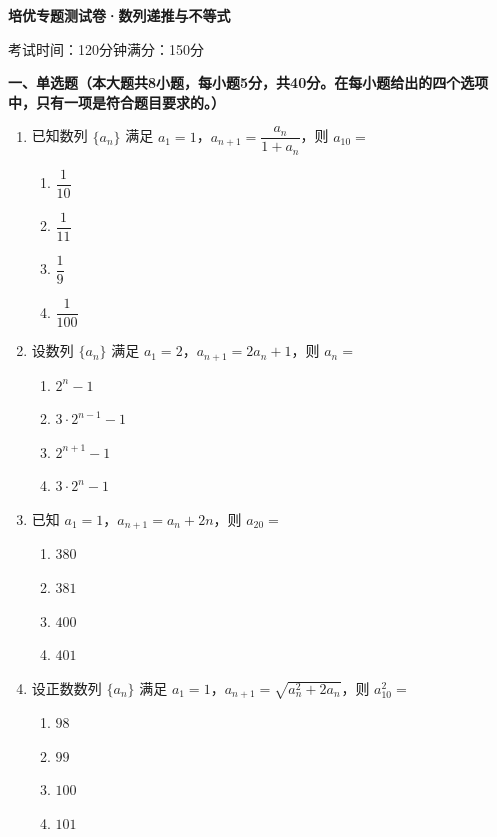 \documentclass[12pt, a4paper]{ctexart}
\newcommand{\score}[1]{\hfill\makebox[2cm][l]{(#1分)}}
\begin{document}
\begin{center}
\Large\textbf{培优专题测试卷·数列递推与不等式}

\normalsize
考试时间：120分钟\quad 满分：150分
\end{center}

\vspace{0.5cm}

\noindent\textbf{一、单选题（本大题共8小题，每小题5分，共40分。在每小题给出的四个选项中，只有一项是符合题目要求的。）}

\vspace{0.3cm}

\begin{enumerate}
\item 已知数列 $\{a_n\}$ 满足 $a_1 = 1$，$a_{n+1} = \dfrac{a_n}{1 + a_n}$，则 $a_{10} = $\score{5}
\begin{enumerate}[label=\Alph*.]
\item $\dfrac{1}{10}$
\item $\dfrac{1}{11}$
\item $\dfrac{1}{9}$
\item $\dfrac{1}{100}$
\end{enumerate}

\item 设数列 $\{a_n\}$ 满足 $a_1 = 2$，$a_{n+1} = 2a_n + 1$，则 $a_n = $\score{5}
\begin{enumerate}[label=\Alph*.]
\item $2^n - 1$
\item $3 \cdot 2^{n-1} - 1$
\item $2^{n+1} - 1$
\item $3 \cdot 2^n - 1$
\end{enumerate}

\item 已知 $a_1 = 1$，$a_{n+1} = a_n + 2n$，则 $a_{20} = $\score{5}
\begin{enumerate}[label=\Alph*.]
\item $380$
\item $381$
\item $400$
\item $401$
\end{enumerate}

\item 设正数数列 $\{a_n\}$ 满足 $a_1 = 1$，$a_{n+1} = \sqrt{a_n^2 + 2a_n}$，则 $a_{10}^2 = $\score{5}
\begin{enumerate}[label=\Alph*.]
\item $98$
\item $99$
\item $100$
\item $101$
\end{enumerate}


\end{enumerate}
\end{document}
